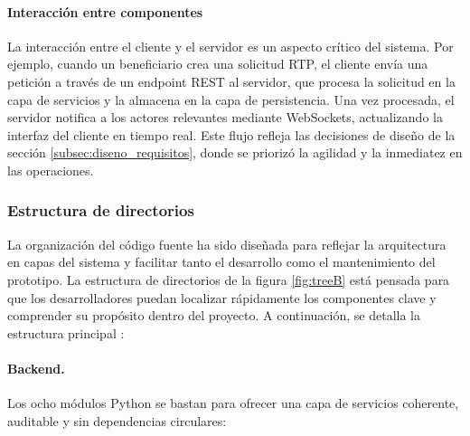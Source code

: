 \paragraph{Interacción entre componentes}

La interacción entre el cliente y el servidor es un aspecto crítico del sistema. Por ejemplo, cuando un beneficiario crea una solicitud RTP, el cliente envía una petición a través de un endpoint REST al servidor, que procesa la solicitud en la capa de servicios y la almacena en la capa de persistencia. Una vez procesada, el servidor notifica a los actores relevantes mediante WebSockets, actualizando la interfaz del cliente en tiempo real. Este flujo refleja las decisiones de diseño de la sección \ref{subsec:diseno_requisitos}, donde se priorizó la agilidad y la inmediatez en las operaciones.


\subsubsection{Estructura de directorios}
\label{sec:impl-vision-tree}

La organización del código fuente ha sido diseñada para reflejar la arquitectura en capas del sistema y facilitar tanto el desarrollo como el mantenimiento del prototipo. La estructura de directorios de la figura \ref{fig:treeB} está pensada para que los desarrolladores puedan localizar rápidamente los componentes clave y comprender su propósito dentro del proyecto. A continuación, se detalla la estructura principal :

\vspace{.6em}
\paragraph*{Backend.}
Los ocho módulos Python se bastan para ofrecer una capa de servicios
coherente, auditable y sin dependencias circulares:

